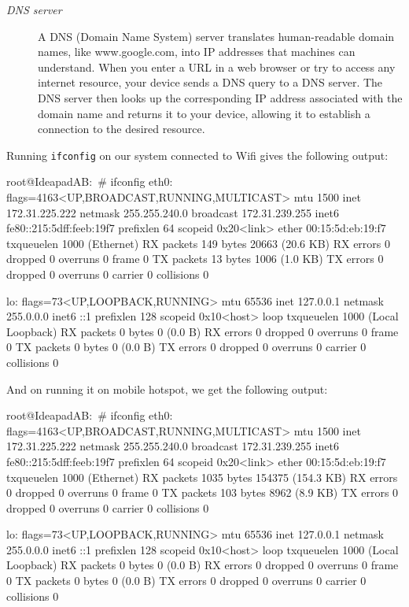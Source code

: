 \begin{description}
        \item[\textit{DNS server}] A DNS (Domain Name System) server translates human-readable domain names, like www.google.com, into IP addresses that machines can understand. When you enter a URL in a web browser or try to access any internet resource, your device sends a DNS query to a DNS server. The DNS server then looks up the corresponding IP address associated with the domain name and returns it to your device, allowing it to establish a connection to the desired resource.
    \end{description}
    
    Running \texttt{ifconfig} on our system connected to Wifi gives the following output:

        
    \begin{code}
    root@IdeapadAB:~# ifconfig
    eth0: flags=4163<UP,BROADCAST,RUNNING,MULTICAST>  mtu 1500
      inet 172.31.225.222  netmask 255.255.240.0  broadcast 172.31.239.255
      inet6 fe80::215:5dff:feeb:19f7  prefixlen 64  scopeid 0x20<link>
      ether 00:15:5d:eb:19:f7  txqueuelen 1000  (Ethernet)
      RX packets 149  bytes 20663 (20.6 KB)
      RX errors 0  dropped 0  overruns 0  frame 0
      TX packets 13  bytes 1006 (1.0 KB)
      TX errors 0  dropped 0 overruns 0  carrier 0  collisions 0

    lo: flags=73<UP,LOOPBACK,RUNNING>  mtu 65536
      inet 127.0.0.1  netmask 255.0.0.0
      inet6 ::1  prefixlen 128  scopeid 0x10<host>
      loop  txqueuelen 1000  (Local Loopback)
      RX packets 0  bytes 0 (0.0 B)
      RX errors 0  dropped 0  overruns 0  frame 0
      TX packets 0  bytes 0 (0.0 B)
      TX errors 0  dropped 0 overruns 0  carrier 0  collisions 0
    \end{code}

    And on running it on mobile hotspot, we get the following output:
    \begin{code}
    root@IdeapadAB:~# ifconfig
    eth0: flags=4163<UP,BROADCAST,RUNNING,MULTICAST>  mtu 1500
        inet 172.31.225.222  netmask 255.255.240.0  broadcast 172.31.239.255
        inet6 fe80::215:5dff:feeb:19f7  prefixlen 64  scopeid 0x20<link>
        ether 00:15:5d:eb:19:f7  txqueuelen 1000  (Ethernet)
        RX packets 1035  bytes 154375 (154.3 KB)
        RX errors 0  dropped 0  overruns 0  frame 0
        TX packets 103  bytes 8962 (8.9 KB)
        TX errors 0  dropped 0 overruns 0  carrier 0  collisions 0

    lo: flags=73<UP,LOOPBACK,RUNNING>  mtu 65536
        inet 127.0.0.1  netmask 255.0.0.0
        inet6 ::1  prefixlen 128  scopeid 0x10<host>
        loop  txqueuelen 1000  (Local Loopback)
        RX packets 0  bytes 0 (0.0 B)
        RX errors 0  dropped 0  overruns 0  frame 0
        TX packets 0  bytes 0 (0.0 B)
        TX errors 0  dropped 0 overruns 0  carrier 0  collisions 0
    \end{code}

